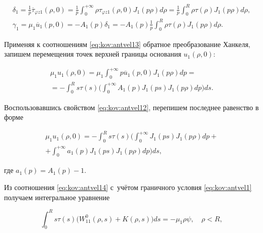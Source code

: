 \begin{equation}

\begin{array}{l}

\displaystyle

\delta_{1}= \frac{1}{p} \overline{\tau}_{\varphi z 1}(\rho, 0)=\frac{1}{p} \int_{0}^{+\infty}\rho \tau_{\varphi z 1}(\rho, 0)J_{1}(p \rho)d\rho=\frac{1}{p}\int _{0}^{R}\rho \tau(\rho)J_{1}(p \rho)d\rho,\\[2mm]

\displaystyle \gamma_{1}=\mu_{1} \overline{u}_{1}(p, 0)=-A_{1}(p)\delta_{1} =-A_{1}(p)\frac{1}{p}\int_{0}^{R}\rho \tau(\rho)J_{1}(p \rho)d\rho. 

\end{array}

\label{eq:kov:antvel13}

\end{equation}

Применяя к соотношениям \eqref{eq:kov:antvel13} обратное преобразование Ханкеля, запишем перемещения точек верхней границы основания $u_{1}(\rho, 0)$:

\begin{multline}

\mu_{1}u_{1}(\rho, 0)=\mu_{1}\int_{0}^{+\infty}p \overline{u}_{1}(p, 0)J_{1}(p \rho)dp= \\ 

=-\int _{0}^{R}s \tau(s)\biggl( \int_{0}^{+\infty}A_{1}(p)J_{1}(p s)J_{1}(p \rho)dp\biggr)ds.

\end{multline}

Воспользовавшись свойством \eqref{eq:kov:antvel12}, перепишем последнее равенство в форме

\begin{multline}

\mu_{1}u_{1}(\rho, 0)=-\int_{0}^{R}s \tau(s)\biggl( \int_{0}^{+\infty}J_{1}(p s)J_{1}(p \rho)dp + {}\\ + \int_{0}^{+\infty}a_{1}(p)J_{1}(p s)J_{1}(p \rho)dp\biggr)ds,

\label{eq:kov:antvel14}

\end{multline}

где $a_{1}(p)=A_{1}(p)-1$.



Из соотношения \eqref{eq:kov:antvel14} с~учётом граничного условия \eqref{eq:kov:antvel1} получаем интегральное уравнение 

\begin{equation*}

\int_{0}^{R}s \tau(s)\bigl( W^{0}_{11}(\rho,s)+K(\rho,s)\bigr)ds=-\mu_{1} \rho \psi, \quad  \rho<R,

\end{equation*}

